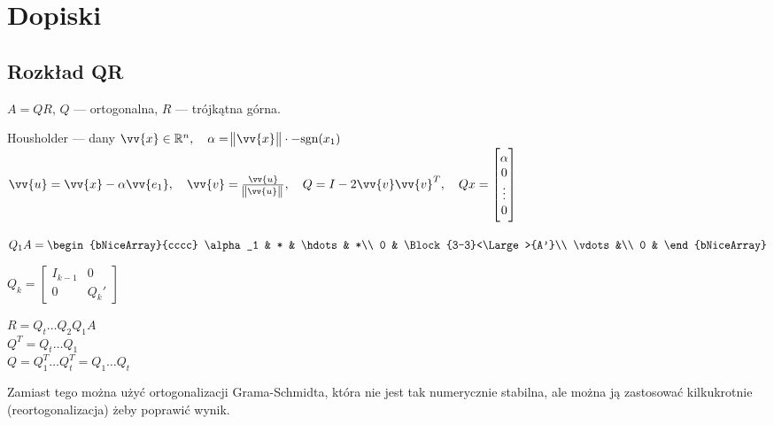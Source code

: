\section{Dopiski}
\subsection{Rozkład QR}
\entry
$A = QR$, $Q$ --- ortogonalna, $R$ --- trójkątna górna.

\entry
Housholder --- dany $\vv{x} \in \mathbb{R}^n,\quad \alpha = \norm{\vv{x}} \cdot -\text{sgn}(x_1)$\\
$\vv{u} = \vv{x} - \alpha\vv{e_1},\quad \vv{v} = \frac{\vv{u}}{\norm{\vv{u}}},\quad Q = I - 2\vv{v}\vv{v}^T,\quad Qx = \begin{bmatrix} \alpha \\ 0 \\ \vdots \\ 0 \end{bmatrix}$

\entry
$
Q_1A =
\begin{bNiceArray}{cccc}
  \alpha_1 & * & \hdots & *\\
  0 & \Block{3-3}<\Large>{A'}\\
  \vdots &\\
  0 &
\end{bNiceArray}
$

\entry
$
Q_k = \begin{bmatrix}
  I_{k-1} & 0\\
  0 & Q_{k}'
\end{bmatrix}
$

\entry
$R = Q_t \hdots Q_2 Q_1 A$\\
\entry
$Q^T = Q_t \hdots Q_1$\\
\entry
$Q = Q_1^T \hdots Q_t^T = Q_1 \hdots Q_t$

\entry
Zamiast tego można użyć ortogonalizacji Grama-Schmidta, która nie jest tak numerycznie stabilna, ale można ją zastosować kilkukrotnie (reortogonalizacja) żeby poprawić wynik.
